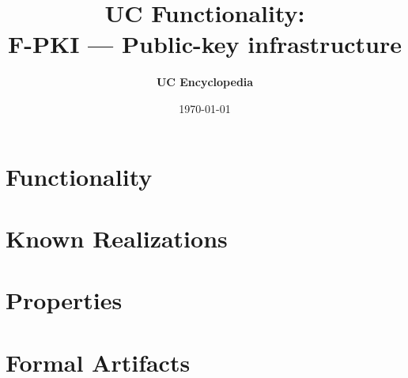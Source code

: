 \documentclass[11pt,a4paper]{article}
\title{\textbf{\Large UC Functionality:}\\[0.2em] \Large F-PKI --- Public-key infrastructure}
\author{\textbf{UC Encyclopedia}}
\date{\today}
\newtheorem{functionality}{Functionality}
\begin{document}
\maketitle

\begin{abstract}
\end{abstract}

\section{Functionality}

%

\section{Known Realizations}


\section{Properties}


\section{Formal Artifacts}

\end{document}
